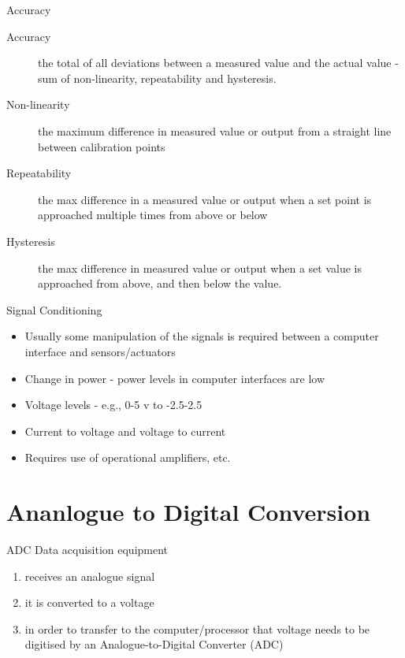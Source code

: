 \documentclass[svgnames,x11names]{beamer}
\begin{document}
\begin{frame}{Accuracy}
\begin{description}
\item[Accuracy] the total of all deviations between a measured
value and the actual value - sum of non-linearity,
repeatability and hysteresis.
\item[Non-linearity] the maximum difference in measured value
or output from a straight line between calibration points
\item[Repeatability] the max difference in a measured value or
output when a set point is approached multiple times from
above or below
\item[Hysteresis] the max difference in measured value or
output when a set value is approached from above, and then
below the value.
\end{description}
\end{frame}

\begin{frame}{Signal Conditioning}
\begin{itemize}
\item Usually some manipulation of the signals is
required between a computer interface and
sensors/actuators
\item Change in power - power levels in computer
interfaces are low
\item Voltage levels - e.g., 0-5 v to -2.5-2.5
\item Current to voltage and voltage to current
\item Requires use of operational amplifiers, etc.
\end{itemize}
\end{frame}

\part{Ananlogue to Digital Conversion}
\frame\partpage

\begin{frame}{ADC}
{Data acquisition equipment}
  \begin{enumerate}
  \item receives an analogue signal
   
    
  \item it is converted to a voltage

    
  \item in order to transfer to the computer/processor that voltage needs
    to be \alert{digitised} by an Analogue-to-Digital Converter (ADC)
  \end{enumerate}

\end{frame}
\end{document}
